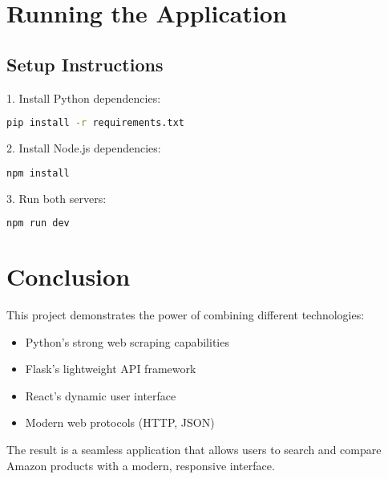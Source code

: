 \documentclass[12pt,a4paper]{article}
\begin{document}
\section{Running the Application}
\subsection{Setup Instructions}
1. Install Python dependencies:
\begin{lstlisting}[language=bash]
pip install -r requirements.txt
\end{lstlisting}

2. Install Node.js dependencies:
\begin{lstlisting}[language=bash]
npm install
\end{lstlisting}

3. Run both servers:
\begin{lstlisting}[language=bash]
npm run dev
\end{lstlisting}

\section{Conclusion}
This project demonstrates the power of combining different technologies:
\begin{itemize}
    \item Python's strong web scraping capabilities
    \item Flask's lightweight API framework
    \item React's dynamic user interface
    \item Modern web protocols (HTTP, JSON)
\end{itemize}

The result is a seamless application that allows users to search and compare Amazon products with a modern, responsive interface.
\end{document}

